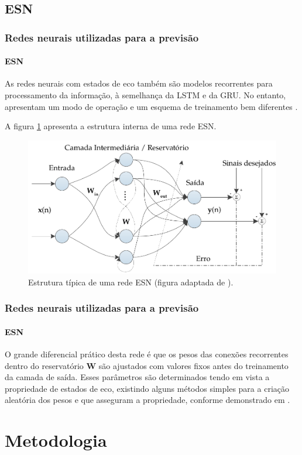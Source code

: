 \documentclass[aspectratio=169]{beamer}
\begin{document}
\subsection{ESN}

\begin{frame}
\frametitle{Redes neurais utilizadas para a previsão}
\framesubtitle{ESN}
\justifying As redes neurais com estados de eco também são modelos recorrentes para processamento da informação, à semelhança da LSTM e da GRU. No entanto, apresentam um modo de operação e um esquema de treinamento bem diferentes  \cite{boccato2013novas}. 

A figura \ref{fig:esn-model} apresenta a estrutura interna de uma rede ESN.
\begin{figure}[H]
\centering
\includegraphics[scale = 0.35]{esn-network.pdf}
\caption{Estrutura típica de uma rede ESN (figura adaptada de \cite{boccato2013novas}).}
\label{fig:esn-model}
\end{figure}
\end{frame}

\begin{frame}
\frametitle{Redes neurais utilizadas para a previsão}
\framesubtitle{ESN}
\justifying O grande diferencial prático desta rede é que os pesos das conexões recorrentes dentro do reservatório $\mathbf{W}$ são ajustados com valores fixos antes do treinamento da camada de saída. Esses parâmetros são determinados tendo em vista a propriedade de estados de eco, existindo alguns métodos simples para a criação aleatória dos pesos e que asseguram a propriedade, conforme demonstrado em \cite{jaeger2007echo}. 
\end{frame}

\section{Metodologia}
\end{document}
